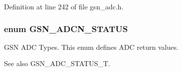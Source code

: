 Definition at line 242 of file gsn\_\-adc.h.

\hypertarget{a00643_gaac5e6c70aa098ca208218da35914fa93}{
\subsubsection[{GSN\_\-ADCN\_\-STATUS}]{\setlength{\rightskip}{0pt plus 5cm}enum {\bf GSN\_\-ADCN\_\-STATUS}}}
\label{a00643_gaac5e6c70aa098ca208218da35914fa93}


GSN ADC Types. This enum defines ADC return values. 

\begin{DoxySeeAlso}{See also}
GSN\_\-ADC\_\-STATUS\_\-T. 
\end{DoxySeeAlso}
